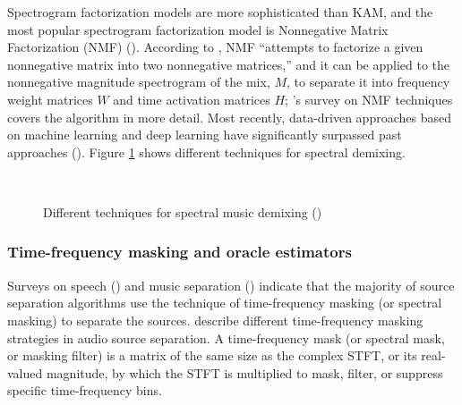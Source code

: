 \documentclass[report.tex]{subfiles}
\begin{document}
Spectrogram factorization models are more sophisticated than KAM, and the most popular spectrogram factorization model is Nonnegative Matrix Factorization (NMF) (\cite{musicsepsurvey, musicsepgood}). According to \textcite{musicsepgood}, NMF ``attempts to factorize a given nonnegative matrix into two nonnegative matrices,'' and it can be applied to the nonnegative magnitude spectrogram of the mix, $M$, to separate it into frequency weight matrices $W$ and time activation matrices $H$; \textcite{nmfpaper}'s survey on NMF techniques covers the algorithm in more detail. Most recently, data-driven approaches based on machine learning and deep learning have significantly surpassed past approaches (\cite{musicsepgood, sisec2018}). Figure \ref{fig:spectraldemix} shows different techniques for spectral demixing.

\begin{figure}[ht]
	\centering
	\\
	\caption{Different techniques for spectral music demixing (\cite{musicsepgood})}
	\label{fig:spectraldemix}
\end{figure}

\newpagefill

\subsubsection{Time-frequency masking and oracle estimators}
\label{sec:masksandoracles}

Surveys on speech (\cite{speechmask}) and music separation (\cite{musicmask}) indicate that the majority of source separation algorithms use the technique of time-frequency masking (or spectral masking) to separate the sources.  \textcite{masking} describe different time-frequency masking strategies in audio source separation. A time-frequency mask (or spectral mask, or masking filter) is a matrix of the same size as the complex STFT, or its real-valued magnitude, by which the STFT is multiplied to mask, filter, or suppress specific time-frequency bins.
\end{document}
